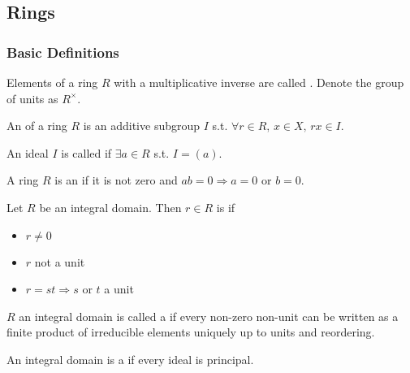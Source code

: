 \documentclass{article}
\begin{document}
\subsection{Rings}

\subsubsection{Basic Definitions}

\begin{definition}
	Elements of a ring $R$ with a multiplicative inverse are called . Denote the group of units as $R^\times$. 
\end{definition}


\begin{definition}
	An  of a ring $R$ is an additive subgroup $I$ s.t. $\forall r \in R, \, x \in X,\, rx \in I$. 
\end{definition}

\begin{definition}
	An ideal $I$ is called  if $\exists a \in R$ s.t. $I = (a)$.  
\end{definition}

\begin{definition}
	A ring $R$ is an  if it is not zero and $ab=0 \Rightarrow a=0$ or $b=0$. 
\end{definition}

\begin{definition}
	Let $R$ be an integral domain. Then $r\in R$ is  if
	\begin{itemize}
		\item $r \neq 0$
		\item $r$ not a unit
		\item $r=st \Rightarrow s$ or $t$ a unit
	\end{itemize}
\end{definition}

\begin{definition}
	$R$ an integral domain is called a  if every non-zero non-unit can be written as a finite product of irreducible elements uniquely up to units and reordering. 
\end{definition}

\begin{definition}
	An integral domain is a  if every ideal is principal. 
\end{definition}
\end{document}
